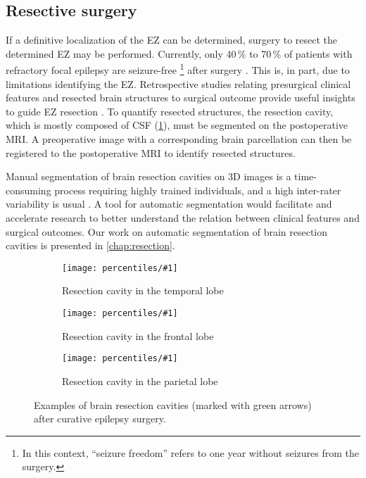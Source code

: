 \subsection{Resective surgery}

If a definitive localization of the \ac{EZ} can be determined, surgery to resect the determined \ac{EZ} may be performed.
Currently, only 40\,\% to 70\,\% of patients with refractory focal epilepsy are seizure-free%
\footnote{In this context, ``seizure freedom'' refers to one year without seizures from the surgery.}
after surgery \cite{jobst_resective_2015}.
This is, in part, due to limitations identifying the \ac{EZ}.
Retrospective studies relating presurgical clinical features and resected brain structures to surgical outcome provide useful insights to guide \ac{EZ} resection \cite{jobst_resective_2015}.
To quantify resected structures, the resection cavity, which is mostly composed of \ac{CSF} (\cref{fig:cavities}), must be segmented on the postoperative \ac{MRI}.
A preoperative image with a corresponding brain parcellation can then be registered to the postoperative \ac{MRI} to identify resected structures.

Manual segmentation of brain resection cavities on 3D images is a time-consuming process requiring highly trained individuals, and a high inter-rater variability is usual \cite{havaei_brain_2017}.
A tool for automatic segmentation would facilitate and accelerate research to better understand the relation between clinical features and surgical outcomes.
Our work on automatic segmentation of brain resection cavities is presented in \cref{chap:resection}.


\newcommand{\plotcavities}[2]{
  \begin{subfigure}{0.9\linewidth}
    \texttt{[image: percentiles/\#1]}
    \caption{#2}
  \end{subfigure}
}

\begin{figure}
  \centering

  \plotcavities{p_050_0185_arrows}{Resection cavity in the temporal lobe}
  \plotcavities{p_075_1263_arrows}{Resection cavity in the frontal lobe}
  \plotcavities{p_025_0039_arrows}{Resection cavity in the parietal lobe}

  \caption[Examples of brain resection cavities after curative epilepsy surgery.]{
    Examples of brain resection cavities (marked with green arrows) after curative epilepsy surgery.
  }
  \label{fig:cavities}
\end{figure}
